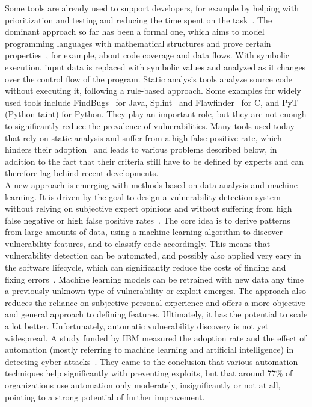 \documentclass[
a4paper,
pagesize,
pdftex,
12pt,
twoside, %
BCOR=5mm, %
ngerman,
fleqn,
final,
]{scrartcl}
\begin{document}
	Some tools are already used to support developers, for example by helping with prioritization and testing and reducing the time spent on the task~\cite{Dam.2017}. The dominant approach so far has been a formal one, which aims to model programming languages with mathematical structures and prove certain properties~\cite{Allamanis.2018}, for example, about code coverage and data flows. With symbolic execution, input data is replaced with symbolic values and analyzed as it changes over the control flow of the program. Static analysis tools analyze source code without executing it, following a rule-based approach. Some examples for widely used tools include FindBugs~\cite{Hovemeyer.2004,Hovemeyer.2005} for Java, Splint~\cite{Evans.2002} and Flawfinder~\cite{Wheeler.2006} for C, and PyT~\cite{Micheelsen.2016} (Python taint) for Python. They play an important role, but they are not enough to significantly reduce the prevalence of vulnerabilities. Many tools used today that rely on static analysis and suffer from a high false positive rate, which hinders their adoption~\cite{Liu.2018} and leads to various problems described below, in addition to the fact that their criteria still have to be defined by experts and can therefore lag behind recent developments.\\
	A new approach is emerging with methods based on data analysis and machine learning. It is driven by the goal to design a vulnerability detection system without relying on subjective expert opinions and without suffering from high false negative or high false positive rates~\cite{Li.2018}. The core idea is to derive patterns from large amounts of data, using a machine learning algorithm to discover vulnerability features, and to classify code accordingly. This means that vulnerability detection can be automated, and possibly also applied very eary in the software lifecycle, which can significantly reduce the costs of finding and fixing errors~\cite{Dam.2017,Gupta.2014}. Machine learning models can be retrained with new data any time a previously unknown type of vulnerability or exploit emerges. The approach also reduces the reliance on subjective personal experience and offers a more objective and general approach to defining features. Ultimately, it has the potential to scale a lot better. Unfortunately, automatic vulnerability discovery is not yet widespread. A study funded by IBM measured the adoption rate and the effect of automation (mostly referring to machine learning and artificial intelligence) in detecting cyber attacks~\cite{IBMNewsRoom.}. They came to the conclusion that various automation techniques help significantly with preventing exploits, but that around 77\% of organizations use automation only moderately, insignificantly or not at all, pointing to a strong potential of further improvement. 
	
\end{document}
